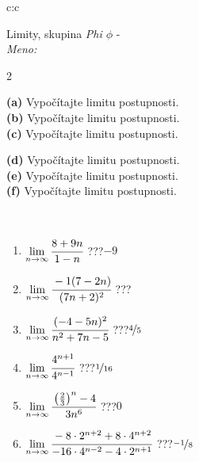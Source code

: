 \documentclass[10pt]{report}
\begin{document}
\newpage
\thispagestyle{empty}
\begin{tabular}{c:c}
\begin{minipage}[c][104.5mm][t]{0.5\linewidth}
\begin{center}
\vspace{5mm}
{\huge Limity, skupina \textit{Phi $\phi$} -}\\[5mm]
\textit{Meno:}\phantom{xxxxxxxxxxxxxxxxxxxxxxxxxxxxxxxxxxxxxxxxxxxxxxxxxxxxxxxxxxxxxxxxx}\\[5mm]
\begin{minipage}{0.95\linewidth}
\begin{center}
{\small \begin{multicols}{2} \raggedright
\textbf{(a)} Vypočítajte limitu postupnosti. \\[1mm]
\textbf{(b)} Vypočítajte limitu postupnosti. \\[1mm]
\textbf{(c)} Vypočítajte limitu postupnosti. \par \columnbreak
\textbf{(d)} Vypočítajte limitu postupnosti. \\[1mm]
\textbf{(e)} Vypočítajte limitu postupnosti. \\[1mm]
\textbf{(f)} Vypočítajte limitu postupnosti.
\end{multicols}
}
\end{center}
\end{minipage}
\\[1mm]
\begin{minipage}{0.79\linewidth}
\begin{center}
\begin{varwidth}{\linewidth}
\setlength{\itemsep}{0pt}
\begin{enumerate}
\footnotesizerr
\item $\lim\limits_{n\to\infty}\cfrac{8+9n}{1-n}$\quad \dotfill\; ???\;\dotfill \quad $-9$
\item $\lim\limits_{n\to\infty}\cfrac{-1(7-2n)}{(7n+2)^2}$\quad \dotfill\; ???\;\dotfill {}
\item $\lim\limits_{n\to\infty}\cfrac{(-4-5n)^2}{n^2+7n-5}$\quad \dotfill\; ???\;\dotfill \quad $\nicefrac{4}{5}$
\item $\lim\limits_{n\to\infty}\cfrac{4^{n+1}}{4^{n-1}}$\quad \dotfill\; ???\;\dotfill \quad $\nicefrac{1}{16}$
\item $\lim\limits_{n\to\infty}\cfrac{\left(\frac{2}{3}\right)^n -4}{3n^{6}}$\quad \dotfill\; ???\;\dotfill \quad $0$
\item $\lim\limits_{n\to\infty}\cfrac{-8\cdot 2^{n+2}+8\cdot 4^{n+2}}{-16\cdot 4^{n-2}-4\cdot 2^{n+1}}$\quad \dotfill\; ???\;\dotfill \quad $\nicefrac{-1}{8}$

\end{enumerate}
\end{varwidth}
\end{center}
\end{minipage}
\end{center}
\end{minipage}
\end{tabular}
\end{document}
